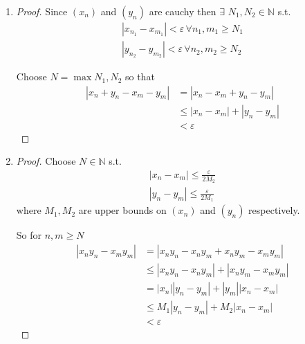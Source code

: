  \begin{enumerate}[label=(\alph*)]
    \item 
    \begin{proof}
        Since $(x_n)$ and $(y_n)$ are cauchy then $\exists$ $N_1, N_2 \in \mathbb{N}$
        s.t. 
        \begin{align*}
            |x_{n_1} - x_{m_1}| < \varepsilon \, \forall n_1, m_1 \geq N_1 \\
            |y_{n_2} - y_{m_2}| < \varepsilon \, \forall n_2, m_2 \geq N_2 
        \end{align*}

        Choose $N = \max{N_1, N_2}$ so that
        \begin{align*}
            |x_n + y_n - x_m - y_m| &= |x_n - x_m + y_n - y_m| \\
                                    &\leq |x_n - x_m| + |y_n - y_m| \\
                                    &< \varepsilon
        \end{align*}
    \end{proof}
    
    \item 
    \begin{proof}
        Choose $N \in \mathbb{N}$ s.t. 
        \begin{gather*}
            |x_n - x_m| \leq \frac{\varepsilon}{2M_2} \\
            |y_n - y_m| \leq \frac{\varepsilon}{2M_1}
        \end{gather*}
        where $M_1, M_2$ are upper bounds on $(x_n)$ and $(y_n)$ respectively.

        So for $n,m \geq N$
        \begin{align*}
            |x_ny_n - x_my_m| &= |x_ny_n  - x_ny_m + x_ny_m - x_my_m| \\
                            &\leq |x_ny_n  - x_ny_m| + |x_ny_m - x_my_m| \\
                            &= |x_n||y_n  - y_m| + |y_m||x_n - x_m| \\
                            &\leq M_1|y_n  - y_m| + M_2|x_n - x_m| \\
                            &< \varepsilon
        \end{align*}
    \end{proof}
 \end{enumerate}

